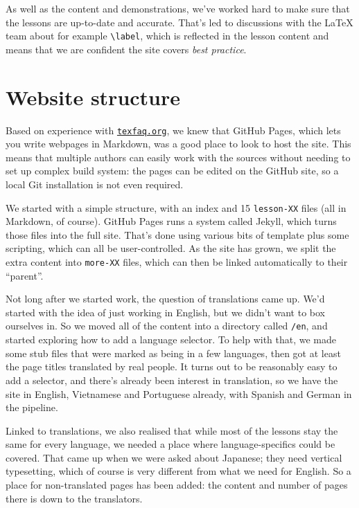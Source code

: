 \documentclass[harvardcite]{ltugboat}
\begin{document}
As well as the content and demonstrations, we've worked hard to make sure that
the lessons are up-to-date and accurate. That's led to discussions with the
\LaTeX{} team about for example \verb|\label|, which is reflected in the lesson
content and means that we are confident the site covers \emph{best practice}.

\section{Website structure}

Based on experience with \href{https://texfaq.org}{\nolinkurl{texfaq.org}}, we knew that GitHub Pages, which
lets you write webpages in Markdown, was a good place to look to host the site.
This means that multiple authors can easily work with the sources without
needing to set up complex build system: the pages can be edited on the GitHub
site, so a local Git installation is not even required.

We started with a simple structure, with an index and 15 \texttt{lesson-XX}
files (all in Markdown, of course). GitHub Pages runs a system called Jekyll,
which turns those files into the full site. That's done using various bits of
template plus some scripting, which can all be user-controlled. As the site has
grown, we split the extra content into \texttt{more-XX} files, which can then
be linked automatically to their \enquote{parent}.

Not long after we started work, the question of translations came up. We'd started
with the idea of just working in English, but we didn't want to box ourselves in.
So we moved all of the content into a directory called \texttt{/en}, and started
exploring how to add a language selector. To help with that, we made some stub
files that were marked as being in a few languages, then got at least the
page titles translated by real people. It turns out to be reasonably easy
to add a selector, and there's already been interest in translation, so
we have the site in English, Vietnamese and Portuguese already, with Spanish
and German in the pipeline.

Linked to translations, we also realised that while most of the lessons stay
the same for every language, we needed a place where language-specifics could
be covered. That came up when we were asked about Japanese; they need vertical
typesetting, which of course is very different from what we need for English.
So a place for non-translated pages has been added: the content and number of
pages there is down to the translators.
\end{document}
